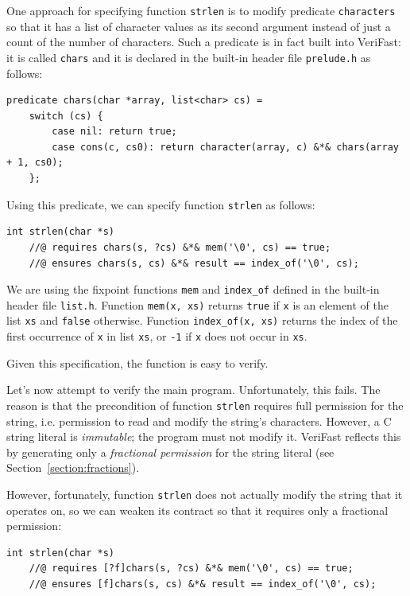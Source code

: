 \documentclass{article}
\begin{document}
One approach for specifying function \lstinline!strlen! is to modify predicate \lstinline!characters! so that it has a list of character values as its
second argument instead of just a count of the number of characters. Such a predicate is in fact built into VeriFast: it is called \lstinline!chars! and it
is declared in the built-in header file \lstinline!prelude.h! as follows:
\begin{lstlisting}
predicate chars(char *array, list<char> cs) =
    switch (cs) {
        case nil: return true;
        case cons(c, cs0): return character(array, c) &*& chars(array + 1, cs0);
    };
\end{lstlisting}
Using this predicate, we can specify function \lstinline!strlen! as follows:
\begin{lstlisting}
int strlen(char *s)
    //@ requires chars(s, ?cs) &*& mem('\0', cs) == true;
    //@ ensures chars(s, cs) &*& result == index_of('\0', cs);
\end{lstlisting}
We are using the fixpoint functions \lstinline!mem! and \lstinline!index_of! defined in the built-in header file \lstinline!list.h!. Function
\lstinline!mem(x, xs)! returns \lstinline!true! if \lstinline!x! is an element of the list \lstinline!xs! and \lstinline!false! otherwise.
Function \lstinline!index_of(x, xs)! returns the index of the first occurrence of \lstinline!x! in list \lstinline!xs!, or \lstinline!-1! if \lstinline!x!
does not occur in \lstinline!xs!.

Given this specification, the function is easy to verify.

Let's now attempt to verify the main program. Unfortunately, this fails. The reason is that the precondition of function \lstinline!strlen! requires full
permission for the string, i.e. permission to read and modify the string's characters. However, a C string literal is \emph{immutable}; the program must
not modify it. VeriFast reflects this by generating only a \emph{fractional permission} for the string literal (see Section~\ref{section:fractions}).

However, fortunately, function \lstinline!strlen! does not actually modify the string that it operates on, so we can weaken its contract so that it requires
only a fractional permission:
\begin{lstlisting}
int strlen(char *s)
    //@ requires [?f]chars(s, ?cs) &*& mem('\0', cs) == true;
    //@ ensures [f]chars(s, cs) &*& result == index_of('\0', cs);
\end{lstlisting}
\end{document}
